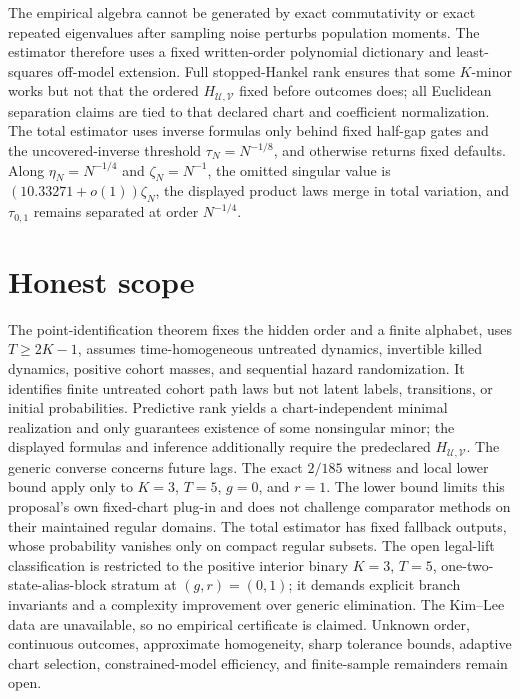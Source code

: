 \documentclass{article}
\begin{document}
The empirical algebra cannot be generated by exact commutativity or exact repeated eigenvalues after sampling noise perturbs population moments. The estimator therefore uses a fixed written-order polynomial dictionary and least-squares off-model extension. Full stopped-Hankel rank ensures that some \(K\)-minor works but not that the ordered \(H_{\mathcal U,\mathcal V}\) fixed before outcomes does; all Euclidean separation claims are tied to that declared chart and coefficient normalization. The total estimator uses inverse formulas only behind fixed half-gap gates and the uncovered-inverse threshold \(\tau_N=N^{-1/8}\), and otherwise returns fixed defaults. Along \(\eta_N=N^{-1/4}\) and \(\zeta_N=N^{-1}\), the omitted singular value is \((10.33271+o(1))\zeta_N\), the displayed product laws merge in total variation, and \(\tau_{0,1}\) remains separated at order \(N^{-1/4}\).

\section{Honest scope}

The point-identification theorem fixes the hidden order and a finite alphabet, uses \(T\ge2K-1\), assumes time-homogeneous untreated dynamics, invertible killed dynamics, positive cohort masses, and sequential hazard randomization. It identifies finite untreated cohort path laws but not latent labels, transitions, or initial probabilities. Predictive rank yields a chart-independent minimal realization and only guarantees existence of some nonsingular minor; the displayed formulas and inference additionally require the predeclared \(H_{\mathcal U,\mathcal V}\). The generic converse concerns future lags. The exact \(2/185\) witness and local lower bound apply only to \(K=3\), \(T=5\), \(g=0\), and \(r=1\). The lower bound limits this proposal's own fixed-chart plug-in and does not challenge comparator methods on their maintained regular domains. The total estimator has fixed fallback outputs, whose probability vanishes only on compact regular subsets. The open legal-lift classification is restricted to the positive interior binary \(K=3\), \(T=5\), one-two-state-alias-block stratum at \((g,r)=(0,1)\); it demands explicit branch invariants and a complexity improvement over generic elimination. The Kim--Lee data are unavailable, so no empirical certificate is claimed. Unknown order, continuous outcomes, approximate homogeneity, sharp tolerance bounds, adaptive chart selection, constrained-model efficiency, and finite-sample remainders remain open.
\end{document}
